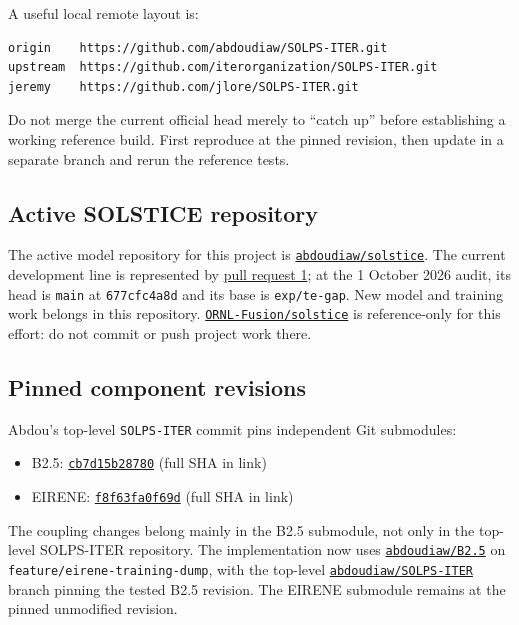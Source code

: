 \documentclass[11pt]{article}
\begin{document}
A useful local remote layout is:

\begin{lstlisting}[basicstyle=\ttfamily\small,frame=single]
origin    https://github.com/abdoudiaw/SOLPS-ITER.git
upstream  https://github.com/iterorganization/SOLPS-ITER.git
jeremy    https://github.com/jlore/SOLPS-ITER.git
\end{lstlisting}

Do not merge the current official head merely to ``catch up'' before establishing a working reference build. First reproduce at the pinned revision, then update in a separate branch and rerun the reference tests.

\subsection{Active SOLSTICE repository}

The active model repository for this project is
\href{https://github.com/abdoudiaw/solstice}{\texttt{abdoudiaw/solstice}}.
The current development line is represented by
\href{https://github.com/abdoudiaw/solstice/pull/1}{pull request 1}; at the
1 October 2026 audit, its head is \texttt{main} at \texttt{677cfc4a8d} and
its base is \texttt{exp/te-gap}. New model and training work belongs in this
repository. \href{https://github.com/ORNL-Fusion/solstice}{\texttt{ORNL-Fusion/solstice}}
is reference-only for this effort: do not commit or push project work there.

\subsection{Pinned component revisions}

Abdou's top-level \texttt{SOLPS-ITER} commit pins independent Git submodules:

\begin{itemize}
\item B2.5: \href{https://github.com/iterorganization/B2.5/tree/cb7d15b2878074bb450666bebee4b1df02ef79e6}{\texttt{cb7d15b28780}} (full SHA in link)
\item EIRENE: \href{https://github.com/iterorganization/EIRENE/tree/f8f63fa0f69d7fb64a7d19f2ec372fd58eb5efc5}{\texttt{f8f63fa0f69d}} (full SHA in link)
\end{itemize}

The coupling changes belong mainly in the B2.5 submodule, not only in the top-level SOLPS-ITER repository. The implementation now uses \href{https://github.com/abdoudiaw/B2.5}{\texttt{abdoudiaw/B2.5}} on \texttt{feature/eirene-training-dump}, with the top-level \href{https://github.com/abdoudiaw/SOLPS-ITER}{\texttt{abdoudiaw/SOLPS-ITER}} branch pinning the tested B2.5 revision. The EIRENE submodule remains at the pinned unmodified revision.
\end{document}

